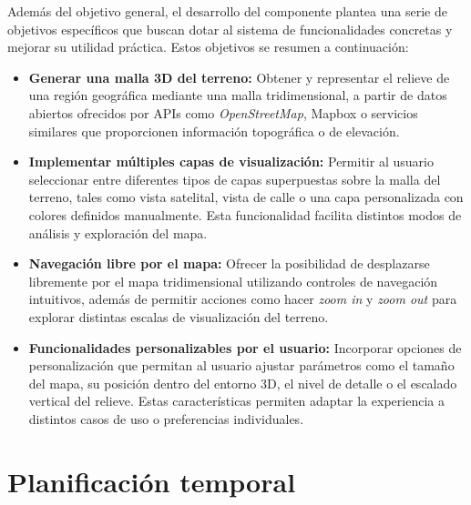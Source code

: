 \documentclass[a4paper, 12pt]{book}
\begin{document}

Además del objetivo general, el desarrollo del componente plantea una serie de objetivos específicos que buscan dotar al sistema de funcionalidades concretas y mejorar su utilidad práctica. Estos objetivos se resumen a continuación:

\begin{itemize}
  \item \textbf{Generar una malla 3D del terreno:} Obtener y representar el relieve de una región geográfica mediante una malla tridimensional, a partir de datos abiertos ofrecidos por APIs como \textit{OpenStreetMap}, Mapbox o servicios similares que proporcionen información topográfica o de elevación.

  \item \textbf{Implementar múltiples capas de visualización:} Permitir al usuario seleccionar entre diferentes tipos de capas superpuestas sobre la malla del terreno, tales como vista satelital, vista de calle o una capa personalizada con colores definidos manualmente. Esta funcionalidad facilita distintos modos de análisis y exploración del mapa.

  \item \textbf{Navegación libre por el mapa:} Ofrecer la posibilidad de desplazarse libremente por el mapa tridimensional utilizando controles de navegación intuitivos, además de permitir acciones como hacer \textit{zoom in} y \textit{zoom out} para explorar distintas escalas de visualización del terreno.

  \item \textbf{Funcionalidades personalizables por el usuario:} Incorporar opciones de personalización que permitan al usuario ajustar parámetros como el tamaño del mapa, su posición dentro del entorno 3D, el nivel de detalle o el escalado vertical del relieve. Estas características permiten adaptar la experiencia a distintos casos de uso o preferencias individuales.
\end{itemize}



\section{Planificación temporal}
\label{sec:planificacion-temporal}

\end{document}
